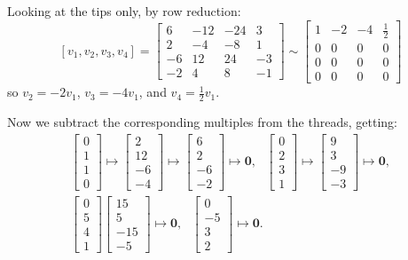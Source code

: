 \documentclass[12pt]{article}
\newcommand{\1}{\mathbf{1}}
\newcommand{\0}{\mathbf{0}}
\theoremstyle{definition}
\begin{document}
Looking at the tips only, by row reduction:
\[
[v_1, v_2, v_3, v_4] =
\left[\begin{matrix}6 & -12 & -24 & 3\\2 & -4 & -8 & 1\\-6 & 12 & 24 & -3\\-2 & 4 & 8 & -1\end{matrix}\right]
\sim
\left[\begin{matrix}1 & -2 & -4 & \frac{1}{2}\\0 & 0 & 0 & 0\\0 & 0 & 0 & 0\\0 & 0 & 0 & 0\end{matrix}\right]
\]
so $v_2 = -2v_1$, $v_3 = -4v_1$, and $v_4 = \frac{1}{2} v_1$.

Now we subtract the corresponding multiples from the threads, getting:
\[
\begin{gathered}
\left[\begin{matrix}0\\1\\1\\0\end{matrix}\right]
\mapsto
\left[\begin{matrix}2\\12\\-6\\-4\end{matrix}\right]
\mapsto
\left[\begin{matrix}6\\2\\-6\\-2\end{matrix}\right]
\mapsto
\0
, \ \ \
\left[\begin{matrix}0\\2\\3\\1\end{matrix}\right]
\mapsto
\left[\begin{matrix}9\\3\\-9\\-3\end{matrix}\right]
\mapsto
\0
,
\\
\left[\begin{matrix}0\\5\\4\\1\end{matrix}\right]
\left[\begin{matrix}15\\5\\-15\\-5\end{matrix}\right]
\mapsto
\0
, \ \ \
\left[\begin{matrix}0\\-5\\3\\2\end{matrix}\right]
\mapsto
\0
.
\end{gathered}
\]
\end{document}
